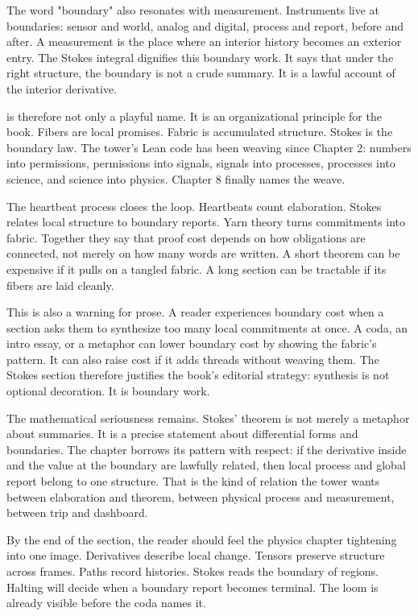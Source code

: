 The word "boundary" also resonates with measurement. Instruments live at
boundaries: sensor and world, analog and digital, process and report, before
and after. A measurement is the place where an interior history becomes an
exterior entry. The Stokes integral dignifies this boundary work. It says that
under the right structure, the boundary is not a crude summary. It is a lawful
account of the interior derivative.

 is therefore not only a playful name. It is an organizational
principle for the book. Fibers are local promises. Fabric is accumulated
structure. Stokes is the boundary law. The tower's Lean code has been weaving
since Chapter 2: numbers into permissions, permissions into signals, signals
into processes, processes into science, and science into physics. Chapter 8
finally names the weave.

The heartbeat process closes the loop. Heartbeats count elaboration. Stokes
relates local structure to boundary reports. Yarn theory turns commitments
into fabric. Together they say that proof cost depends on how obligations are
connected, not merely on how many words are written. A short theorem can be
expensive if it pulls on a tangled fabric. A long section can be tractable if
its fibers are laid cleanly.

This is also a warning for prose. A reader experiences boundary cost when a
section asks them to synthesize too many local commitments at once. A coda, an
intro essay, or a metaphor can lower boundary cost by showing the fabric's
pattern. It can also raise cost if it adds threads without weaving them. The
Stokes section therefore justifies the book's editorial strategy: synthesis is
not optional decoration. It is boundary work.

The mathematical seriousness remains. Stokes' theorem is not merely a metaphor
about summaries. It is a precise statement about differential forms and
boundaries. The chapter borrows its pattern with respect: if the derivative
inside and the value at the boundary are lawfully related, then local process
and global report belong to one structure. That is the kind of relation the
tower wants between elaboration and theorem, between physical process and
measurement, between trip and dashboard.

By the end of the section, the reader should feel the physics chapter tightening
into one image. Derivatives describe local change. Tensors preserve structure
across frames. Paths record histories. Stokes reads the boundary of regions.
Halting will decide when a boundary report becomes terminal. The loom is
already visible before the coda names it.


